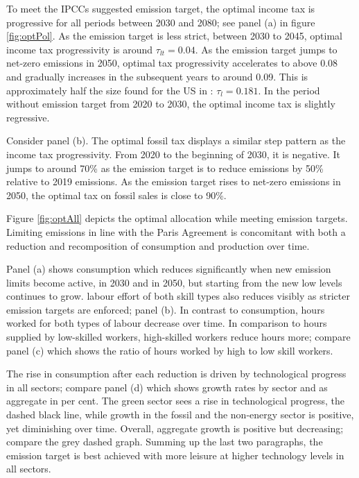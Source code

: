 To meet the IPCCs suggested emission target, the optimal income tax is progressive for all periods between 2030 and 2080; see panel (a) in figure \ref{fig:optPol}. As the emission target is less strict, between 2030 to 2045, optimal income tax progressivity is around $\tau_{lt}=0.04$. As the emission target jumps to net-zero emissions in 2050, optimal tax progressivity accelerates to above 0.08 and gradually increases in the subsequent years to around 0.09. This is approximately half the size found for the US in \cite{Heathcote2017OptimalFramework}: $\tau_{l}=0.181$. 
In the period without emission target from 2020 to 2030, the optimal income tax is slightly regressive.

Consider panel (b). The optimal fossil tax displays a similar step pattern as the income tax progressivity. From 2020 to the beginning of 2030, it is negative. It jumps to around 70\% as the emission target is to reduce emissions by 50\% relative to 2019 emissions. As the emission target rises  to net-zero emissions in 2050, the optimal tax on fossil sales is close to 90\%. 

Figure \ref{fig:optAll} depicts the optimal allocation while meeting emission targets. Limiting emissions in line with the Paris Agreement is concomitant with both a reduction and recomposition of consumption and production over time. 

Panel (a) shows consumption which reduces significantly when new emission limits become active, in 2030 and in 2050, but starting from the new low levels continues to grow. labour effort of both skill types also reduces visibly as stricter emission targets are enforced; panel (b). In contrast to consumption, hours worked for both types of labour decrease over time. In comparison to hours supplied by low-skilled workers, high-skilled workers reduce hours more; compare panel (c) which shows the ratio of hours worked by high to low skill workers. 

The rise in consumption after each reduction is driven by technological progress in all sectors; compare panel (d) which shows growth rates by sector and as aggregate in per cent. 
The green sector sees a rise in technological progress, the dashed black line, while growth in the fossil and the non-energy sector is positive, yet diminishing over time. Overall, aggregate growth is positive but decreasing; compare the grey dashed graph. 
Summing up the last two paragraphs, the emission target is best achieved with more leisure at higher technology levels in all sectors. 

